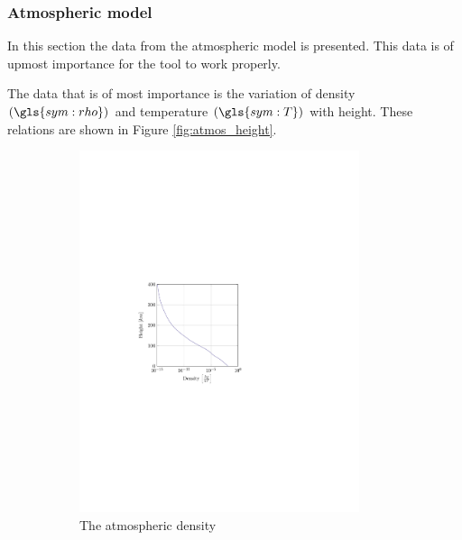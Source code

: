 \subsubsection{Atmospheric model}
\label{sec:astroatmos}

In this section the data from the atmospheric model is presented. This data is of upmost importance for the tool to work properly.

The data that is of most importance is the variation of density $\left(\gls{sym:rho}\right)$ and temperature $\left(\gls{sym:T}\right)$ with height. These relations are shown in Figure \ref{fig:atmos_height}.

\begin{figure}[ht!]
	\centering
	\begin{subfigure}{0.45\textwidth}
	\centering
	\includegraphics[trim={4cm 9.8cm 9cm 10cm},clip,width=0.9\textwidth]{Figure/atmos_model/density.pdf}
	\caption{The atmospheric density} 
	\label{fig:atmos_height_rho}
	\end{subfigure}
	\begin{subfigure}{0.45\textwidth}
	\centering

\end{subfigure}
\end{figure}
